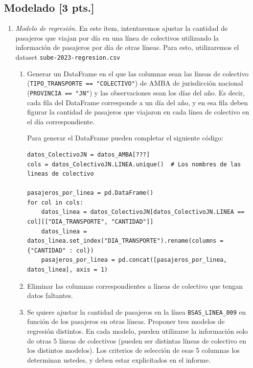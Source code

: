 \documentclass[a4paper,11pt]{article}
\theoremstyle{definition}
\begin{document}
\subsection*{Modelado [3 pts.]}
\begin{enumerate}\addtocounter{enumi}{4}
\item \textit{Modelo de regresión.}
En este \'item, intentaremos ajustar la cantidad de pasajeros que viajan por día en una línea de colectivos utilizando la información de pasajeros por día de otras líneas. Para esto, utilizaremos el dataset \verb|sube-2023-regresion.csv|

\begin{enumerate}
\item Generar un DataFrame en el que las columnas sean las líneas de colectivo (\lstinline{TIPO_TRANSPORTE == "COLECTIVO"}) de AMBA de jurisdicción nacional (\lstinline{PROVINCIA == "JN"}) y las observaciones sean los días del año. Es decir, cada fila del DataFrame corresponde a un día del año, y en esa fila deben figurar la cantidad de pasajeros que viajaron en cada línea de colectivo en el día correspondiente.
    
    Para generar el DataFrame pueden completar el siguiente código:
    \newpage
\begin{lstlisting}
datos_ColectivoJN = datos_AMBA[???]
cols = datos_ColectivoJN.LINEA.unique()  # Los nombres de las lineas de colectivo

pasajeros_por_linea = pd.DataFrame()
for col in cols:
    datos_linea = datos_ColectivoJN[datos_ColectivoJN.LINEA == col][["DIA_TRANSPORTE", "CANTIDAD"]]
    datos_linea = datos_linea.set_index("DIA_TRANSPORTE").rename(columns = {"CANTIDAD" : col})
    pasajeros_por_linea = pd.concat([pasajeros_por_linea, datos_linea], axis = 1)
\end{lstlisting}

\item Eliminar las columnas correspondientes a l\'ineas de colectivo que tengan datos faltantes.

\item Se quiere ajustar la cantidad de pasajeros en la l\'inea \lstinline{BSAS_LINEA_009} en funci\'on de los pasajeros en otras l\'ineas.
Proponer tres modelos de regresi\'on distintos. En cada modelo, pueden utilizarse la informaci\'on solo de otras 5 l\'ineas de colectivos (pueden ser distintas l\'ineas de colectivo en los distintos modelos). Los criterios de selecci\'on de esas 5 columnas los determinan ustedes, y deben estar explicitados en el informe.


\end{enumerate}
\end{enumerate}
\end{document}
